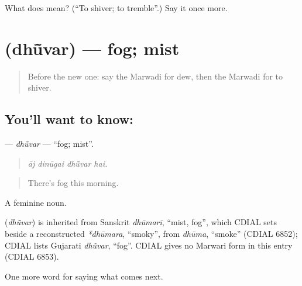 \begin{tcolorbox}[breakable,colback=teal!4,colframe=teal!35!black,title={Before you move on}]
What does  mean? (\textquotedblleft{}To shiver; to tremble\textquotedblright{}.) Say it once more.
\end{tcolorbox}
\section[\texorpdfstring{\mw{धूंवर} (dhū̃var)}{धूंवर (dhū̃var)}]{ (dhū̃var) — fog; mist}

\label{lesson:MW-C222-dhuvar}



\begin{quote}
Before the new one: say the Marwadi for dew, then the Marwadi for to shiver.
\end{quote}

\subsection*{You'll want to know: }
\textbf{} — \emph{dhū̃var} — \textquotedblleft{}fog; mist\textquotedblright{}.

\begin{quote}
   
\end{quote}

\begin{quote}
\emph{āj dinūgai dhū̃var hai.}
\end{quote}

\begin{quote}
There's fog this morning.
\end{quote}

A feminine noun.

\begin{cousinweb}
\textbf{} (\emph{dhū̃var}) is inherited from Sanskrit \emph{dhūmarī}, \textquotedblleft{}mist, fog\textquotedblright{}, which CDIAL sets beside a reconstructed \emph{*dhūmara}, \textquotedblleft{}smoky\textquotedblright{}, from \emph{dhūma}, \textquotedblleft{}smoke\textquotedblright{} (CDIAL 6852); CDIAL lists Gujarati \emph{dhũvar}, \textquotedblleft{}fog\textquotedblright{}. CDIAL gives no Marwari form in this entry (CDIAL 6853).
\end{cousinweb}

\begin{grammarlens}[title={What you've built}]
One more word for saying what comes next.
\end{grammarlens}

